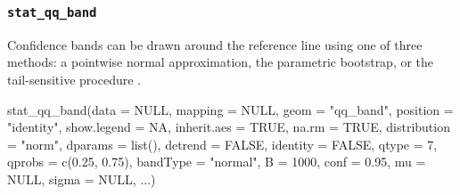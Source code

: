 \subsubsection{\texorpdfstring{\texttt{stat\_qq\_band}}{stat\_qq\_band}}\label{stat_qq_band}

Confidence bands can be drawn around the reference line using one of
three methods: a pointwise normal approximation, the parametric
bootstrap, or the tail-sensitive procedure \citep{Aldor-Noiman2013-xw}.

\begin{Schunk}
\begin{Sinput}
stat_qq_band(data = NULL,
             mapping = NULL,
             geom = "qq_band",
             position = "identity",
             show.legend = NA,
             inherit.aes = TRUE,
             na.rm = TRUE,
             distribution = "norm",
             dparams = list(),
             detrend = FALSE,
             identity = FALSE,
             qtype = 7,
             qprobs = c(0.25, 0.75),
             bandType = "normal",
             B = 1000,
             conf = 0.95,
             mu = NULL,
             sigma = NULL,
             ...)
\end{Sinput}
\end{Schunk}

